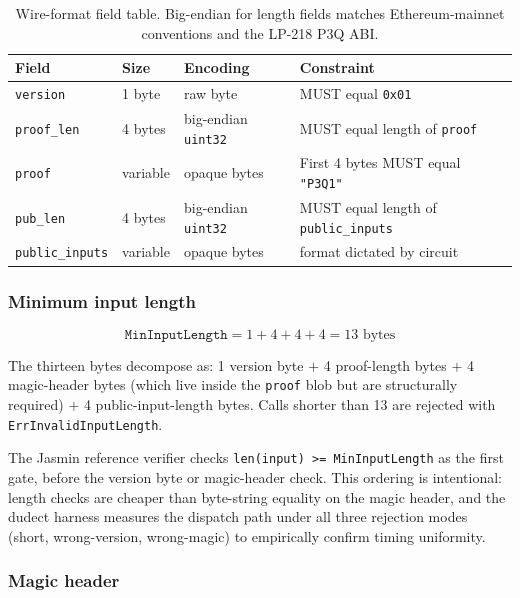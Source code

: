 \begin{table}[h]
\centering
\small
\begin{tabular}{@{}llll@{}}
\toprule
\textbf{Field} & \textbf{Size} & \textbf{Encoding} & \textbf{Constraint} \\
\midrule
\texttt{version}        & 1 byte  & raw byte       & MUST equal \texttt{0x01} \\
\texttt{proof\_len}     & 4 bytes & big-endian \texttt{uint32} & MUST equal length of \texttt{proof} \\
\texttt{proof}          & variable & opaque bytes   & First 4 bytes MUST equal \texttt{"P3Q1"} \\
\texttt{pub\_len}       & 4 bytes & big-endian \texttt{uint32} & MUST equal length of \texttt{public\_inputs} \\
\texttt{public\_inputs} & variable & opaque bytes   & format dictated by circuit \\
\bottomrule
\end{tabular}
\caption{Wire-format field table. Big-endian for length fields
matches Ethereum-mainnet conventions and the LP-218 P3Q ABI.}
\label{tab:wire-fields}
\end{table}

\subsubsection{Minimum input length}

\begin{equation*}
\texttt{MinInputLength} = 1 + 4 + 4 + 4 = 13 \text{ bytes}
\end{equation*}

The thirteen bytes decompose as: 1 version byte $+$ 4 proof-length
bytes $+$ 4 magic-header bytes (which live inside the
\texttt{proof} blob but are structurally required) $+$ 4
public-input-length bytes. Calls shorter than \SI{13}{\byte} are
rejected with \texttt{ErrInvalidInputLength}.

The Jasmin reference verifier checks
\texttt{len(input) >= MinInputLength} as the first gate, before the
version byte or magic-header check. This ordering is intentional:
length checks are cheaper than byte-string equality on the magic
header, and the dudect harness measures the dispatch path under all
three rejection modes (short, wrong-version, wrong-magic) to
empirically confirm timing uniformity.

\subsubsection{Magic header}

